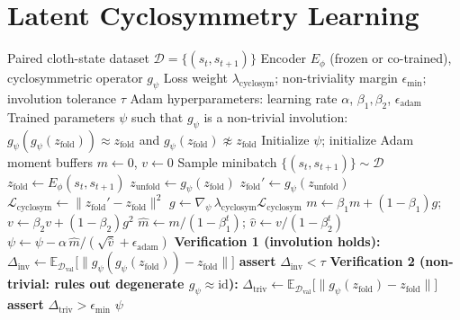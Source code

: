 \documentclass[11pt]{article}
\begin{document}
\section{Latent Cyclosymmetry Learning}
\label{sec:cyclosym}

\begin{algorithm}[H]
\caption{Latent Cyclosymmetry Learning (Standalone Pretraining)}
\label{alg:cyclosymmetry}
\begin{algorithmic}[1]
\Require Paired cloth-state dataset $\mathcal{D} = \{(s_t, s_{t+1})\}$
\Require Encoder $E_\phi$ (frozen or co-trained), cyclosymmetric operator $g_\psi$
\Require Loss weight $\lambda_{\text{cyclosym}}$; non-triviality margin $\epsilon_{\min}$; involution tolerance $\tau$
\Require Adam hyperparameters: learning rate $\alpha$, $\beta_1, \beta_2$, $\epsilon_{\text{adam}}$
\Ensure Trained parameters $\psi$ such that $g_\psi$ is a non-trivial involution: $g_\psi(g_\psi(z_{\text{fold}})) \approx z_{\text{fold}}$ and $g_\psi(z_{\text{fold}}) \not\approx z_{\text{fold}}$
\State Initialize $\psi$; initialize Adam moment buffers $m \gets 0$, $v \gets 0$
    \State Sample minibatch $\{(s_t, s_{t+1})\} \sim \mathcal{D}$
    \State $z_{\text{fold}} \gets E_\phi(s_t, s_{t+1})$ 
    \State $z_{\text{unfold}} \gets g_\psi(z_{\text{fold}})$
    \State $z_{\text{fold}}' \gets g_\psi(z_{\text{unfold}})$
    \State $\mathcal{L}_{\text{cyclosym}} \gets \lVert z_{\text{fold}}' - z_{\text{fold}} \rVert^2$ 
    \State $g \gets \nabla_{\psi}\,\lambda_{\text{cyclosym}}\mathcal{L}_{\text{cyclosym}}$
    \State $m \gets \beta_1 m + (1-\beta_1) g$; \quad $v \gets \beta_2 v + (1-\beta_2) g^2$
    \State $\hat{m} \gets m / (1-\beta_1^{t})$; \quad $\hat{v} \gets v / (1-\beta_2^{t})$
    \State $\psi \gets \psi - \alpha\, \hat{m} / (\sqrt{\hat{v}} + \epsilon_{\text{adam}})$
\EndWhile
\State \textbf{Verification 1 (involution holds):}
\State \hspace{1em} $\Delta_{\text{inv}} \gets \mathbb{E}_{\mathcal{D}_{\text{val}}}\big[\lVert g_\psi(g_\psi(z_{\text{fold}})) - z_{\text{fold}} \rVert\big]$
\State \hspace{1em} \textbf{assert} $\Delta_{\text{inv}} < \tau$
\State \textbf{Verification 2 (non-trivial: rules out degenerate $g_\psi \approx \mathrm{id}$):}
\State \hspace{1em} $\Delta_{\text{triv}} \gets \mathbb{E}_{\mathcal{D}_{\text{val}}}\big[\lVert g_\psi(z_{\text{fold}}) - z_{\text{fold}} \rVert\big]$
\State \hspace{1em} \textbf{assert} $\Delta_{\text{triv}} > \epsilon_{\min}$
\State \Return $\psi$
\end{algorithmic}
\end{algorithm}
\end{document}
